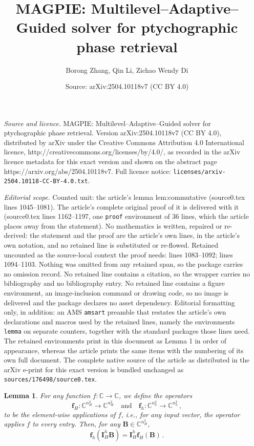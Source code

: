 \documentclass[10pt,a4paper]{amsart}
\title{MAGPIE: Multilevel--Adaptive--Guided solver for ptychographic phase retrieval}
\author{Borong Zhang, Qin Li, Zichao Wendy Di}
\date{Source: arXiv:2504.10118v7 (CC BY 4.0)}
\newtheorem{lemma}{Lemma}
\begin{document}
\maketitle

\noindent\emph{Source and licence.} MAGPIE: Multilevel--Adaptive--Guided solver for ptychographic phase retrieval. Version arXiv:2504.10118v7 (CC BY 4.0), distributed by arXiv under the Creative Commons Attribution 4.0 International licence, http://creativecommons.org/licenses/by/4.0/, as recorded in the arXiv licence metadata for this exact version and shown on the abstract page https://arxiv.org/abs/2504.10118v7. Full licence notice: \texttt{licenses/arxiv-2504.10118-CC-BY-4.0.txt}.\par\smallskip

\noindent\textit{Editorial scope.} Counted unit: the article's lemma lem:commutative (source0.tex lines 1045--1081). The article's complete original proof of it is delivered with it (source0.tex lines 1162--1197, one \texttt{proof} environment of 36 lines, which the article places away from the statement). No mathematics is written, repaired or re-derived: the statement and the proof are the article's own lines, in the article's own notation, and no retained line is substituted or re-flowed.  Retained uncounted as the source-local context the proof needs: lines 1083--1092; lines 1094--1103.  Nothing was omitted from any retained span, so the package carries no omission record.  No retained line contains a citation, so the wrapper carries no bibliography and no bibliography entry.  No retained line contains a figure environment, an image-inclusion command or drawing code, so no image is delivered and the package declares no asset dependency.  Editorial formatting only, in addition: an AMS \texttt{amsart} preamble that restates the article's own declarations and macros used by the retained lines, namely the environments \texttt{lemma} on separate counters, together with the standard packages those lines need.  The retained environments print in this document as Lemma 1 in order of appearance, whereas the article prints the same items with the numbering of its own full document.  The complete native source of the article as distributed in the arXiv e-print for this exact version is bundled unchanged as \texttt{sources/176498/source0.tex}.
\begin{lemma}\label{lem:unary}
    For any function $f:\mathbb{C}\to\mathbb{C}$, we define the operators
\begin{equation*}
    \bm{f}_H:\mathbb{C}^{n_H^2}\to\mathbb{C}^{n_H^2}\quad\text{and}\quad \bm{f}_h:\mathbb{C}^{n_h^2}\to\mathbb{C}^{n_h^2}\,,
\end{equation*}
to be the element-wise applications of $f$, i.e., for any input vector, the operator applies $f$ to every entry. Then, for any $\bm{B}\in\mathbb{C}^{n_H^2}$,
\begin{equation*}
    \bm{f}_h\left(\bm{I}_H^h\bm{B}\right)= \bm{I}_H^h\bm{f}_H(\bm{B})\,.
\end{equation*}
\end{lemma}
\end{document}
